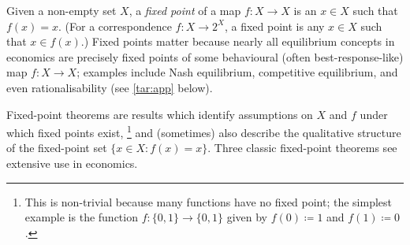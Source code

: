 




Given a non-empty set $X$, a \emph{fixed point} of a map $f : X \to X$ is an $x \in X$ such that $f(x)=x$.
(For a correspondence $f : X \to 2^X$, a fixed point is any $x \in X$ such that $x \in f(x)$.)
Fixed points matter because nearly all equilibrium concepts in economics are precisely fixed points of some behavioural (often best-response-like) map $f : X \to X$; examples include Nash equilibrium, competitive equilibrium, and even rationalisability (see \cref{tar:app} below).

Fixed-point theorems are results which identify assumptions on $X$ and $f$ under which fixed points exist,%
	\footnote{This is non-trivial because many functions have no fixed point; the simplest example is the function $f : \{0,1\} \to \{0,1\}$ given by $f(0) \coloneqq 1$ and $f(1) \coloneqq 0$.}
and (sometimes) also describe the qualitative structure of the fixed-point set $\{ x \in X : f(x)=x \}$.
Three classic fixed-point theorems see extensive use in economics.

